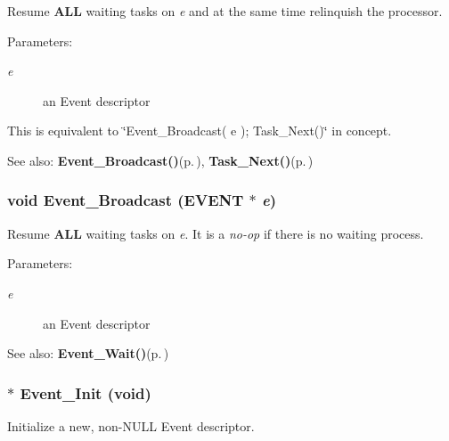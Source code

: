 Resume {\bf ALL} waiting tasks on {\em e\/} and at the same time relinquish the processor. 

\begin{Desc}
\item[Parameters:]
\begin{description}
\item[{\em e}]an Event descriptor\end{description}
\end{Desc}
This is equivalent to \char`\"{}Event\_\-Broadcast( e ); Task\_\-Next()\char`\"{} in concept. \begin{Desc}
\item[See also:]{\bf Event\_\-Broadcast()}{\rm (p.\,\pageref{os_8c_93f9686857f1f8cc4fe1585df3de4874})}, {\bf Task\_\-Next()}{\rm (p.\,\pageref{os_8c_5a9b72d0dadaea32fec8d4ff1c0eafa4})} \end{Desc}
\subsubsection{\setlength{\rightskip}{0pt plus 5cm}void Event\_\-Broadcast ({\bf EVENT} $\ast$ {\em e})}\label{os_8c_93f9686857f1f8cc4fe1585df3de4874}


Resume {\bf ALL} waiting tasks on {\em e\/}. It is a {\em no-op\/} if there is no waiting process. 

\begin{Desc}
\item[Parameters:]
\begin{description}
\item[{\em e}]an Event descriptor\end{description}
\end{Desc}
\begin{Desc}
\item[See also:]{\bf Event\_\-Wait()}{\rm (p.\,\pageref{os_8c_e279428ffa0e59261a01899cea931503})} \end{Desc}
\subsubsection{$\ast$ Event\_\-Init (void)}\label{os_8c_852c4f8ed9198c7c996cc5e9ce7f1f2b}


Initialize a new, non-NULL Event descriptor. 

